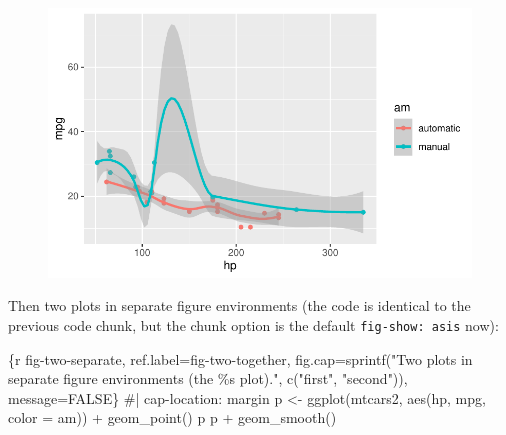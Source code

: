 \documentclass[
  letterpaper,
  DIV=11,
  numbers=noendperiod,
  oneside]{scrartcl}
\newenvironment{Shaded}{\begin{snugshade}}{\end{snugshade}}
\newcommand{\AttributeTok}[1]{\textcolor[rgb]{0.40,0.45,0.13}{#1}}
\newcommand{\CommentTok}[1]{\textcolor[rgb]{0.37,0.37,0.37}{#1}}
\newcommand{\FunctionTok}[1]{\textcolor[rgb]{0.28,0.35,0.67}{#1}}
\newcommand{\InformationTok}[1]{\textcolor[rgb]{0.37,0.37,0.37}{#1}}
\newcommand{\NormalTok}[1]{\textcolor[rgb]{0.00,0.23,0.31}{#1}}
\newcommand{\OtherTok}[1]{\textcolor[rgb]{0.00,0.23,0.31}{#1}}
\newcommand{\SpecialCharTok}[1]{\textcolor[rgb]{0.37,0.37,0.37}{#1}}
\begin{document}
\begin{figure}[H]


{\centering \includegraphics{HousePrices_files/figure-pdf/fig-two-together-2.pdf}

}

\end{figure}

Then two plots in separate figure environments (the code is identical to
the previous code chunk, but the chunk option is the default
\texttt{fig-show:\ asis} now):

\begin{Shaded}
\begin{Highlighting}[]
\InformationTok{\textasciigrave{}\textasciigrave{}\textasciigrave{}\{r fig{-}two{-}separate, ref.label=\textquotesingle{}fig{-}two{-}together\textquotesingle{}, fig.cap=sprintf("Two plots in separate figure environments (the \%s plot).", c("first", "second")), message=FALSE\}}
\CommentTok{\#| cap{-}location: margin}
\NormalTok{p }\OtherTok{\textless{}{-}} \FunctionTok{ggplot}\NormalTok{(mtcars2, }\FunctionTok{aes}\NormalTok{(hp, mpg, }\AttributeTok{color =}\NormalTok{ am)) }\SpecialCharTok{+}
  \FunctionTok{geom\_point}\NormalTok{()}
\NormalTok{p}
\NormalTok{p }\SpecialCharTok{+} \FunctionTok{geom\_smooth}\NormalTok{()}
\InformationTok{\textasciigrave{}\textasciigrave{}\textasciigrave{}}
\end{Highlighting}
\end{Shaded}
\end{document}
